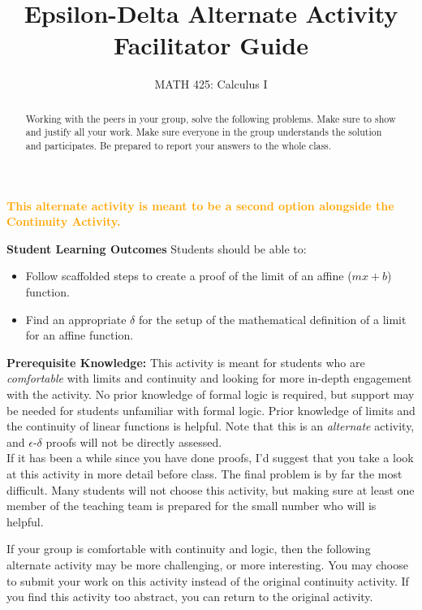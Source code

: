 \documentclass{ximera}
\title{Epsilon-Delta Alternate Activity Facilitator Guide}
\author{MATH 425: Calculus I}
\begin{document}
\begin{abstract}
   Working with the peers in your group, solve the following problems. Make sure to show and justify all your work. Make sure everyone in the group understands the solution and participates. Be prepared to report your answers to the whole class. 
\end{abstract}
\maketitle

\textcolor{orange}{\textbf{This alternate activity is meant to be a second option alongside the Continuity Activity.}}

\textbf{Student Learning Outcomes}
Students should be able to:
    \begin{itemize}
        \item Follow scaffolded steps to create a proof of the limit of an affine ($mx+b$) function.
        \item Find an appropriate $\delta$ for the setup of the mathematical definition of a limit for an affine function.
    \end{itemize}

\textbf{Prerequisite Knowledge:} This activity is meant for students who are \textit{comfortable} with limits and continuity and looking for more in-depth engagement with the activity.  No prior knowledge of formal logic is required, but support may be needed for students unfamiliar with formal logic.  Prior knowledge of limits and the continuity of linear functions is helpful.  Note that this is an \textit{alternate} activity, and $\epsilon$-$\delta$ proofs will not be directly assessed.\\

If it has been a while since you have done proofs, I'd suggest that you take a look at this activity in more detail before class.  The final problem is by far the most difficult.  Many students will not choose this activity, but making sure at least one member of the teaching team is prepared for the small number who will is helpful.

If your group is comfortable with continuity and logic, then the following alternate activity may be more challenging, or more interesting.  You may choose to submit your work on this activity instead of the original continuity activity.  If you find this activity too abstract, you can return to the original activity. \\
\end{document}
